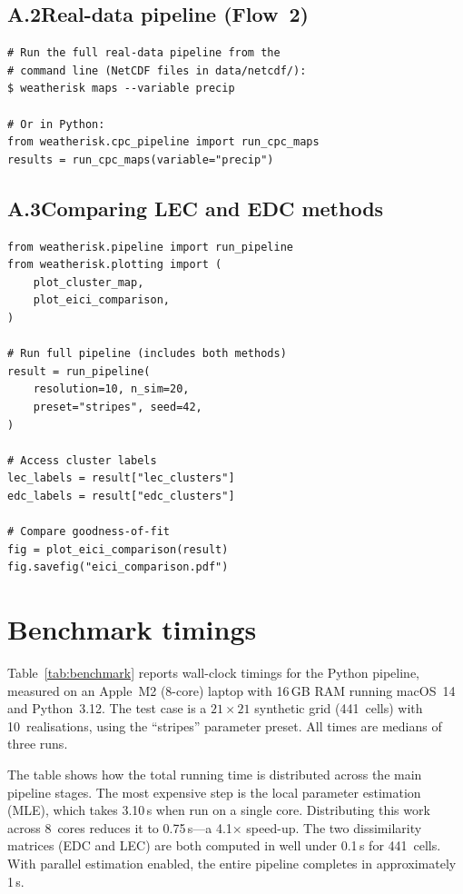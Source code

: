 \documentclass[preprint,12pt,a4paper]{elsarticle}
\begin{document}
\subsection{A.2\quad Real-data pipeline (Flow~2)}

\begin{lstlisting}[caption={CPC precipitation clustering via
  CLI.}, label=lst:app-cpc-cli]
# Run the full real-data pipeline from the
# command line (NetCDF files in data/netcdf/):
$ weatherisk maps --variable precip

# Or in Python:
from weatherisk.cpc_pipeline import run_cpc_maps
results = run_cpc_maps(variable="precip")
\end{lstlisting}

\subsection{A.3\quad Comparing LEC and EDC methods}

\begin{lstlisting}[caption={Running both clustering methods
  and comparing results.}, label=lst:app-compare]
from weatherisk.pipeline import run_pipeline
from weatherisk.plotting import (
    plot_cluster_map,
    plot_eici_comparison,
)

# Run full pipeline (includes both methods)
result = run_pipeline(
    resolution=10, n_sim=20,
    preset="stripes", seed=42,
)

# Access cluster labels
lec_labels = result["lec_clusters"]
edc_labels = result["edc_clusters"]

# Compare goodness-of-fit
fig = plot_eici_comparison(result)
fig.savefig("eici_comparison.pdf")
\end{lstlisting}

\section{Benchmark timings}
\label{app:benchmark}

Table~\ref{tab:benchmark} reports wall-clock timings for the Python
pipeline, measured on an Apple~M2 (8-core) laptop with 16\,GB RAM
running macOS~14 and Python~3.12.  The test case is a $21\times 21$
synthetic grid (441~cells) with 10~realisations, using the
``stripes'' parameter preset.  All times are medians of three runs.

The table shows how the total running time is distributed across
the main pipeline stages.  The most expensive step is the local
parameter estimation (MLE), which takes 3.10\,s when run on a
single core.  Distributing this work across 8~cores reduces it to
0.75\,s---a 4.1$\times$ speed-up.  The two dissimilarity matrices
(EDC and LEC) are both computed in well under 0.1\,s for 441~cells.
With parallel estimation enabled, the entire pipeline completes in
approximately 1\,s.
\end{document}
